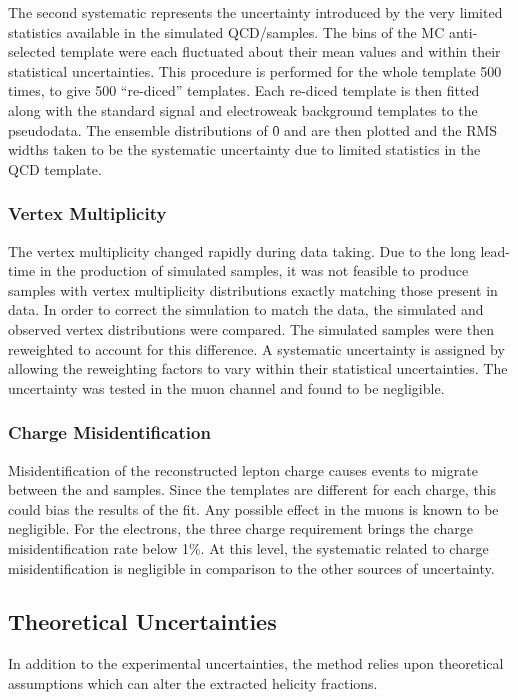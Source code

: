 The second systematic represents the uncertainty introduced by the very limited
statistics available in the simulated \ac{QCD}/\gammajets samples. The bins of
the \ac{MC} anti-selected template were each fluctuated about their mean
values and within their statistical uncertainties. This procedure is performed
for the whole template 500 times, to give 500 ``re-diced'' templates. Each
re-diced template is then fitted along with the standard signal and electroweak
background templates to the pseudodata. The ensemble distributions of \f0 and
\fLmfR are then plotted and the \ac{RMS} widths taken to be the systematic
uncertainty due to limited statistics in the \ac{QCD} template.

\subsubsection{Vertex Multiplicity}
The vertex multiplicity changed rapidly during data taking. Due to the long
lead-time in the production of simulated samples, it was not feasible to produce
samples with vertex multiplicity distributions exactly matching those present in
data. In order to correct the simulation to match the data, the simulated and
observed vertex distributions were compared. The simulated samples were then
reweighted to account for this difference. A systematic uncertainty is assigned
by allowing the reweighting factors to vary within their statistical
uncertainties. The uncertainty was tested in the muon channel and found to be
negligible.

\subsubsection{Charge Misidentification}
\label{sec:wpol_syst_charge_misid}
Misidentification of the reconstructed lepton charge causes events to migrate
between the \PWp and \PWm samples. Since the templates are different for each
charge, this could bias the results of the fit. Any possible effect in the muons
is known to be negligible. For the electrons, the three charge requirement
brings the charge misidentification rate below 1\%. At this level, the
systematic related to charge misidentification is negligible in comparison to
the other sources of uncertainty.


\subsection{Theoretical Uncertainties}
In addition to the experimental uncertainties, the method relies upon
theoretical assumptions which can alter the extracted helicity fractions.

